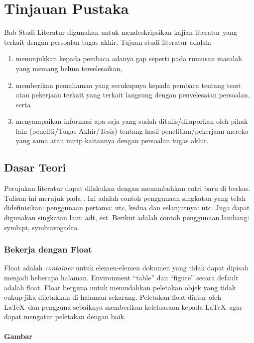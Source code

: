 \chapter{Tinjauan Pustaka}

Bab Studi Literatur digunakan untuk mendeskripsikan kajian literatur yang terkait dengan persoalan tugas akhir. Tujuan studi literatur adalah:

\begin{enumerate}
    \item menunjukkan kepada pembaca adanya gap seperti pada rumusan masalah yang memang belum terselesaikan,
    \item memberikan pemahaman yang secukupnya kepada pembaca tentang teori atau pekerjaan terkait yang terkait langsung dengan penyelesaian persoalan, serta
    \item menyampaikan informasi apa saja yang sudah ditulis/dilaporkan oleh pihak lain (peneliti/Tugas Akhir/Tesis) tentang hasil penelitian/pekerjaan mereka yang sama atau mirip kaitannya dengan persoalan tugas akhir.
\end{enumerate}

\section{Dasar Teori}
Perujukan literatur dapat dilakukan dengan menambahkan entri baru di berkas. Tulisan ini merujuk pada \cite{knuth2001art}. Ini adalah contoh penggunaan singkatan yang telah didefinisikan: penggunaan pertama: \gls{utc}, kedua dan selanjutnya: \gls{utc}. Juga dapat digunakan singkatan lain: \gls{adt}, \gls{est}. Berikut adalah contoh penggunaan lambang: \gls{symb:pi}, \gls{symb:avogadro}.

    \subsection{Bekerja dengan Float}

    Float adalah \textit{container} untuk elemen-elemen dokumen yang tidak dapat dipisah menjadi beberapa halaman. Environment ``table'' dan ``figure'' secara default adalah float. Float berguna untuk memudahkan peletakan objek yang tidak cukup jika diletakkan di halaman sekarang. Peletakan float diatur oleh \LaTeX\ dan pengguna sebaiknya memberikan keleluasaan kepada \LaTeX\ agar dapat mengatur peletakan dengan baik. 
    
    \subsubsection{Gambar}
    
